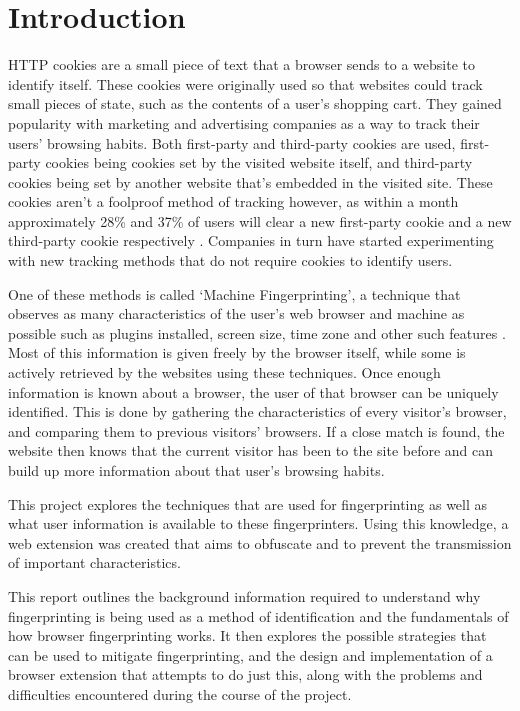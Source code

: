 \chapter{Introduction}

HTTP cookies are a small piece of text that a browser sends to a website to identify itself.
These cookies were originally used so that websites could track small pieces of state, such as the contents of a user's shopping cart.
They gained popularity with marketing and advertising companies as a way to track their users' browsing habits.
Both first-party and third-party cookies are used, first-party cookies being cookies set by the visited website itself, and third-party cookies being set by another website that's embedded in the visited site.
These cookies aren't a foolproof method of tracking however, as within a month approximately 28\% and 37\% of users will clear a new first-party cookie and a new third-party cookie respectively \citep{comScore-cookies}.
Companies in turn have started experimenting with new tracking methods that do not require cookies to identify users.

One of these methods is called `Machine Fingerprinting', a technique that observes as many characteristics of the user's web browser and machine as possible such as plugins installed, screen size, time zone and other such features \citep{audio-fingerprint}.
Most of this information is given freely by the browser itself, while some is actively retrieved by the websites using these techniques.
Once enough information is known about a browser, the user of that browser can be uniquely identified.
This is done by gathering the characteristics of every visitor's browser, and comparing them to previous visitors' browsers.
If a close match is found, the website then knows that the current visitor has been to the site before and can build up more information about that user's browsing habits.

This project explores the techniques that are used for fingerprinting as well as what user information is available to these fingerprinters. Using this knowledge, a web extension was created that aims to obfuscate and to prevent the transmission of important characteristics.

This report outlines the background information required to understand why fingerprinting is being used as a method of identification and the fundamentals of how browser fingerprinting works.
It then explores the possible strategies that can be used to mitigate fingerprinting, and the design and implementation of a browser extension that attempts to do just this, along with the problems and difficulties encountered during the course of the project.

